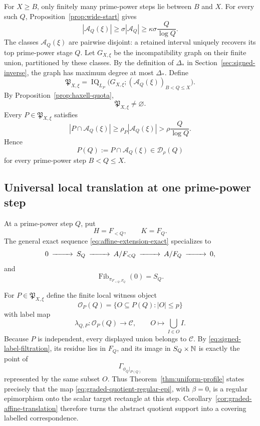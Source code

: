 For $X\ge B$, only finitely many prime-power steps lie between $B$ and $X$.  For every such $Q$, Proposition~\ref{prop:wide-start} gives
\begin{equation}\label{eq:survivor-density}
|\mathcal A_Q(\xi)|
\ge\sigma|\mathcal A_Q|
\ge\kappa\sigma\frac Q{\log Q}.
\end{equation}
The classes $\mathcal A_Q(\xi)$ are pairwise disjoint: a retained interval uniquely recovers its top prime-power stage $Q$.  Let $G_{X,\xi}$ be the incompatibility graph on their finite union, partitioned by these classes.  By the definition of $\Delta_*$ in Section~\ref{sec:signed-inverse}, the graph has maximum degree at most $\Delta_*$.  Define
\begin{equation}\label{eq:haxell-parameter-object}
\mathfrak P_{X,\xi}
=
\operatorname{IQ}_{L_P}
\bigl(G_{X,\xi};(\mathcal A_Q(\xi))_{B<Q\le X}\bigr).
\end{equation}
By Proposition~\ref{prop:haxell-quota},
\begin{equation}\label{eq:haxell-parameter-nonempty}
\mathfrak P_{X,\xi}\ne\varnothing.
\end{equation}
Every $P\in\mathfrak P_{X,\xi}$ satisfies
\begin{equation}\label{eq:packed-density}
|P\cap\mathcal A_Q(\xi)|
\ge\rho_P|\mathcal A_Q(\xi)|
>\rho\frac Q{\log Q}.
\end{equation}
Hence
\[
P(Q):=P\cap\mathcal A_Q(\xi)
\in\mathcal D_\rho(Q)
\]
for every prime-power step $B<Q\le X$.

\subsection{Universal local translation at one prime-power step}

At a prime-power step $Q$, put
\[
H=F_{<Q},
\qquad
K=F_Q.
\]
The general exact sequence \eqref{eq:affine-extension-exact} specializes to
\begin{equation}\label{eq:simple-extension}
\begin{CD}
0 @>>> S_Q @>>> A/F_{<Q} @>>> A/F_Q @>>> 0,
\end{CD}
\end{equation}
and
\[
\operatorname{Fib}_{\pi_{F_{<Q},F_Q}}(0)=S_Q.
\]

For $P\in\mathfrak P_{X,\xi}$ define the finite local witness object
\begin{equation}\label{eq:physical-local-labels}
\mathscr O_P(Q)
=
\{O\subseteq P(Q):|O|\le p\}
\end{equation}
with label map
\[
\lambda_{Q,P}:\mathscr O_P(Q)\longrightarrow\mathcal C,
\qquad
O\longmapsto\bigcup_{I\in O}I.
\]
Because $P$ is independent, every displayed union belongs to $\mathcal C$.  By \eqref{eq:signed-label-filtration}, its residue lies in $F_Q$, and its image in $S_Q\times\mathbb N$ is exactly the point of
\[
\Gamma_{\phi_Q|_{P(Q)}}
\]
represented by the same subset $O$.  Thus Theorem~\ref{thm:uniform-profile} states precisely that the map \eqref{eq:graded-quotient-regular-epi}, with $\beta=0$, is a regular epimorphism onto the scalar target rectangle at this step.  Corollary~\ref{cor:graded-affine-translation} therefore turns the abstract quotient support into a covering labelled correspondence.

